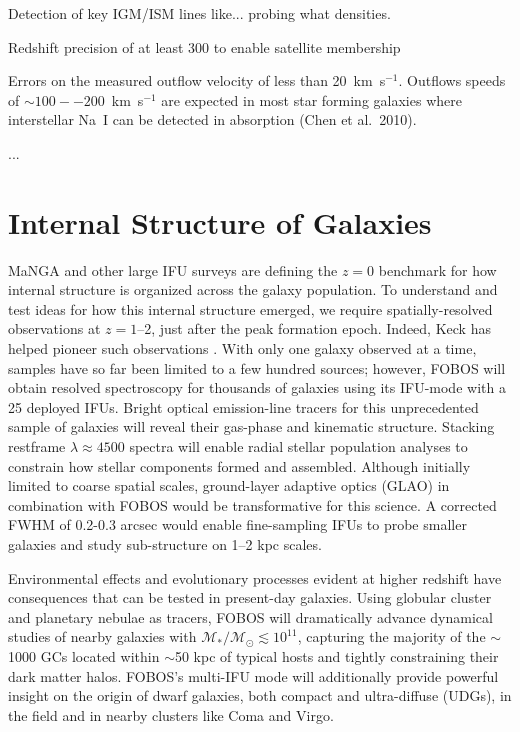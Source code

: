 \documentclass[11pt,a4paper,twoside,onecolumn,openany,final,oldfontcommands]{memoir}
\begin{document}
\begin{sciencerequirement}

\reqitem Detection of key IGM/ISM lines like... probing what densities.

\reqitem Redshift precision of at least 300 \kms{} to enable satellite membership

\reqitem Errors on the measured outflow velocity of less than 20~km~s$^{-1}$.  Outflows speeds of $\sim100 -- 200$~km~s$^{-1}$ are expected in most star forming galaxies where interstellar Na~I can be detected in absorption (Chen et al.~2010). 

\reqitem ...

\end{sciencerequirement}


\section{Internal Structure of Galaxies}
\label{sci:internal}

MaNGA \citep{bundy15} and other large IFU surveys are defining the $z=0$ benchmark for how internal structure is organized across the galaxy population. To understand and test ideas for how this internal structure emerged, we require spatially-resolved observations at $z = 1$--2, just after the peak formation epoch. Indeed, Keck has helped pioneer such observations \citep[e.g.,][]{erb04, miller11,law09}. With only one galaxy observed at a time, samples have so far been limited to a few hundred sources; however, FOBOS will obtain resolved spectroscopy for thousands of galaxies using its IFU-mode with a 25 deployed IFUs. Bright optical emission-line tracers for this unprecedented sample of galaxies will reveal their gas-phase and kinematic structure. Stacking restframe $\lambda \approx 4500$ spectra will enable radial stellar population analyses to constrain how stellar components formed and assembled. Although initially limited to coarse spatial scales, ground-layer adaptive optics (GLAO) in combination with FOBOS would be transformative for this science. A corrected FWHM of 0.2-0.3 arcsec would enable fine-sampling IFUs to probe smaller galaxies and study sub-structure on 1--2 kpc scales.

Environmental effects and evolutionary processes evident at higher redshift have consequences that can be tested in present-day galaxies.  Using globular cluster and planetary nebulae as tracers, FOBOS will dramatically advance dynamical studies of nearby galaxies with $\mathcal{M_\ast/M_\odot} \lesssim 10^{11}$, capturing the majority of the $\sim$1000 GCs located within $\sim$50 kpc of typical hosts \citep[see][]{2013ApJ...772...82H} and tightly constraining their dark matter halos. FOBOS's multi-IFU mode will additionally provide powerful insight on the origin of dwarf galaxies, both compact and ultra-diffuse (UDGs), in the field and in nearby clusters like Coma and Virgo.
\end{document}

